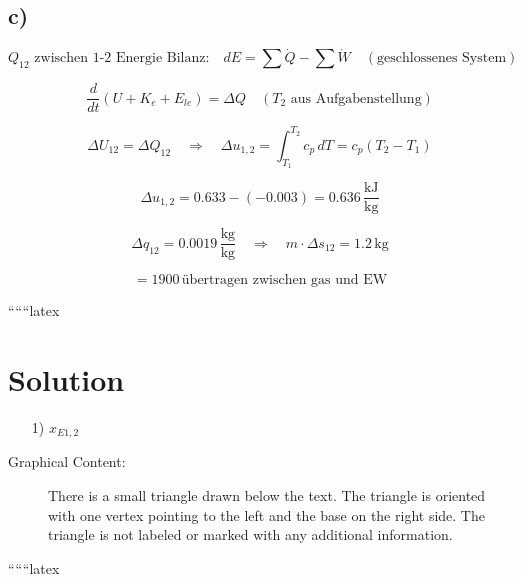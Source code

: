 

\subsection*{c)}

\[
Q_{12} \text{ zwischen 1-2 Energie Bilanz:} \quad dE = \sum \dot{Q} - \sum \dot{W} \quad (\text{geschlossenes System})
\]

\[
\frac{d}{dt} (U + K_e + E_{le}) = \Delta Q \quad (T_2 \text{ aus Aufgabenstellung})
\]

\[
\Delta U_{12} = \Delta Q_{12} \quad \Rightarrow \quad \Delta u_{1,2} = \int_{T_1}^{T_2} c_{p} \, dT = c_{p} (T_2 - T_1)
\]

\[
\Delta u_{1,2} = 0.633 - (-0.003) = 0.636 \, \frac{\text{kJ}}{\text{kg}}
\]

\[
\Delta q_{12} = 0.0019 \, \frac{\text{kg}}{\text{kg}} \quad \Rightarrow \quad m \cdot \Delta s_{12} = 1.2 \, \text{kg}
\]

\[
= 1900 \, \text{übertragen zwischen gas und EW}
\]

``````latex


\section*{Solution}

\begin{itemize}
    \item[1)] \( x_{E1,2} \)
\end{itemize}

\begin{description}
    \item[Graphical Content:] 
    There is a small triangle drawn below the text. The triangle is oriented with one vertex pointing to the left and the base on the right side. The triangle is not labeled or marked with any additional information.
\end{description}

``````latex